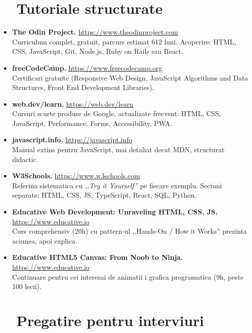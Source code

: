 \section{\faBook\ \ Tutoriale structurate}

\begin{itemize}[itemsep=2pt]
  \item \textbf{The Odin Project.} \url{https://www.theodinproject.com} \\
  Curriculum complet, gratuit, parcurs estimat 6\textendash{}12 luni. Acoperire: HTML, CSS, JavaScript, Git, Node.js, Ruby on Rails sau React.
  \item \textbf{freeCodeCamp.} \url{https://www.freecodecamp.org} \\
  Certificari gratuite (Responsive Web Design, JavaScript Algorithms and Data Structures, Front End Development Libraries).
  \item \textbf{web.dev/learn.} \url{https://web.dev/learn} \\
  Cursuri scurte produse de Google, actualizate frecvent: HTML, CSS, JavaScript, Performance, Forms, Accessibility, PWA.
  \item \textbf{javascript.info.} \url{https://javascript.info} \\
  Manual extins pentru JavaScript, mai detaliat decat MDN, structurat didactic.
  \item \textbf{W3Schools.} \url{https://www.w3schools.com} \\
  Referina sistematica cu \emph{,,Try it Yourself''} pe fiecare exemplu. Seciuni separate: HTML, CSS, JS, TypeScript, React, SQL, Python.
  \item \textbf{Educative \textendash{} Web Development: Unraveling HTML, CSS, JS.} \url{https://www.educative.io} \\
  Curs comprehensiv (20h) cu pattern-ul ,,Hands-On / How it Works'' \textendash{} prezinta aciunea, apoi explica.
  \item \textbf{Educative \textendash{} HTML5 Canvas: From Noob to Ninja.} \url{https://www.educative.io} \\
  Continuare pentru cei interesai de animatii i grafica programatica (9h, peste 100 lecii).
\end{itemize}

\section{\faTrophy\ \ Pregatire pentru interviuri}

